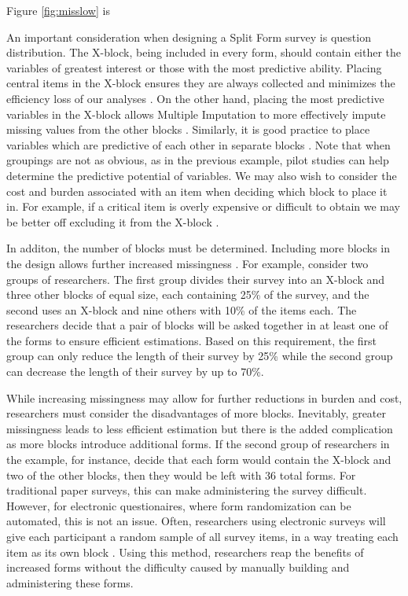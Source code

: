 \documentclass{svjour3}\usepackage[]{graphicx}\usepackage[]{color}
\begin{document}
Figure \ref{fig:misslow} is 


An important consideration when designing a Split Form survey is question distribution. The X-block, being included in every form, should contain either the variables of greatest interest or those with the most predictive ability.
Placing central items in the X-block ensures they are always collected and minimizes the efficiency loss of our analyses \citep{thomas2006evaluation}. On the other hand, placing the most predictive variables in the X-block allows Multiple Imputation to more effectively impute missing values from the other blocks \citep{gottschall2012comparison}. Similarly, it is good practice to place variables which are predictive of each other in separate blocks \citep{gottschall2012comparison}. Note that when groupings are not as obvious, as in the previous example, pilot studies can help determine the predictive potential of variables. We may also wish to consider the cost and burden associated with an item when deciding which block to place it in. For example, if a critical item is overly expensive or difficult to obtain we may be better off excluding it from the X-block \citep{little2013planned}. \par

In additon, the number of blocks must be determined. Including more blocks in the design allows further increased missingness \citep{graham2006planned}. For example, consider two groups of researchers. The first group divides their survey into an X-block and three other blocks of equal size, each containing 25\% of the survey, and the second uses an X-block and nine others with 10\% of the items each. The researchers decide that a pair of blocks will be asked together in at least one of the forms to ensure efficient estimations. Based on this requirement, the first group can only reduce the length of their survey by 25\% while the second group can decrease the length of their survey by up to 70\%. \par

While increasing missingness may allow for further reductions in burden and cost, researchers must consider the disadvantages of more blocks. Inevitably, greater missingness leads to less efficient estimation \citep{rhemtulla2016asymptotic} but there is the added complication as more blocks introduce additional forms. If the second group of researchers in the example, for instance, decide that each form would contain the X-block and two of the other blocks, then they would be left with 36 total forms. For traditional paper surveys, this can make administering the survey difficult. However, for electronic questionaires, where form randomization can be automated, this is not an issue. Often, researchers using electronic surveys will give each participant a random sample of all survey items, in a way treating each item as its own block \citep{silvia2014planned}. Using this method, researchers reap the benefits of increased forms without the difficulty caused by manually building and administering these forms. \par
\end{document}
